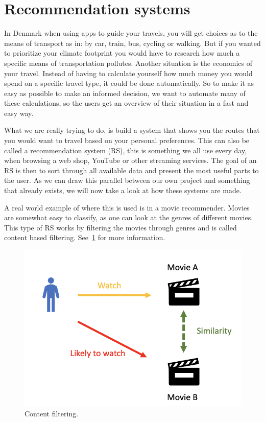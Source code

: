 \section{Recommendation systems}\label{sec:recommendation-systems}

In Denmark when using apps to guide your travels, you will get choices as to the means of transport as in: by car,
train, bus, cycling or walking.
But if you wanted to prioritize your climate footprint you would have to research how much a specific means of
transportation pollutes.
Another situation is the economics of your travel.
Instead of having to calculate yourself how much money you would spend on a specific travel type, it could be done
automatically.
So to make it as easy as possible to make an informed decision, we want to automate many of these calculations, so the
users get an overview of their situation in a fast and easy way.

What we are really trying to do, is build a system that shows you the routes that you would want to travel based on your
personal preferences.
This can also be called a recommendation system (RS), this is something we all use every day, when browsing a web shop,
YouTube or other streaming services.
The goal of an RS is then to sort through all available data and present the most useful parts to the user.
As we can draw this parallel between our own project and something that already exists, we will now take a look at how
these systems are made.

A real world example of where this is used is in a movie recommender.
Movies are somewhat easy to classify, as one can look at the genres of different movies.
This type of RS works by filtering the movies through genres and is called content based filtering.
See~\ref{fig:figure3} for more information.

\begin{figure}
    \centering
    \includegraphics[width=\textwidth]{images/content-filtering}
    \caption{Content filtering.}
    \label{fig:figure3}
\end{figure}

